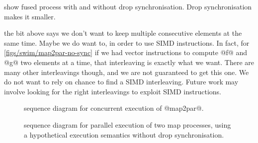  show fused process with and without drop synchronisation. Drop synchronisation makes it smaller.

 the bit above says we don't want to keep multiple consecutive elements at the same time.
Maybe we do want to, in order to use SIMD instructions.
In fact, for \autoref{figs/swim/map2par-no-sync} if we had vector instructions to compute @f@ and @g@ two elements at a time, that interleaving is exactly what we want.
There are many other interleavings though, and we are not guaranteed to get this one.
We do not want to rely on chance to find a SIMD interleaving.
Future work may involve looking for the right interleavings to exploit SIMD instructions.


\begin{figure}
\center
\begin{sequencediagram}




\end{sequencediagram}
\caption[Concurrent sequence diagram for parallel maps]{sequence diagram for concurrent execution of @map2par@. }
\label{figs/swim/map2par}
\end{figure}

\begin{figure}
\center
\begin{sequencediagram}






\end{sequencediagram}
\caption[Hypothetical sequence diagram for parallel maps without drop synchronisation]{sequence diagram for parallel execution of two map processes, using a hypothetical execution semantics without drop synchronisation.}
\label{figs/swim/map2par-no-sync}
\end{figure}


